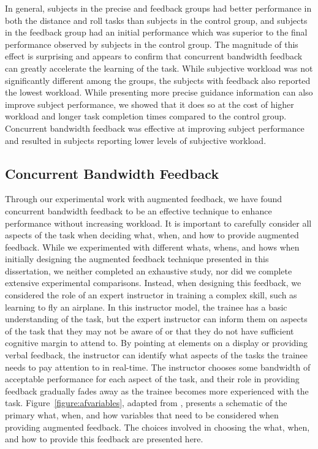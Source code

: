 In general, subjects in the precise and feedback groups had better performance in both the distance and roll tasks than subjects in the control group, and subjects in the feedback group had an initial performance which was superior to the final performance observed by subjects in the control group.
The magnitude of this effect is surprising and appears to confirm that concurrent bandwidth feedback can greatly accelerate the learning of the task.
While subjective workload was not significantly different among the groups, the subjects with feedback also reported the lowest workload.
While presenting more precise guidance information can also improve subject performance, we showed that it does so at the cost of higher workload and longer task completion times compared to the control group.
Concurrent bandwidth feedback was effective at improving subject performance and resulted in subjects reporting lower levels of subjective workload.

\subsection{Concurrent Bandwidth Feedback} \label{section:cbf}

Through our experimental work with augmented feedback, we have found concurrent bandwidth feedback to be an effective technique to enhance performance without increasing workload.
It is important to carefully consider all aspects of the task when deciding what, when, and how to provide augmented feedback.
While we experimented with different whats, whens, and hows when initially designing the augmented feedback technique presented in this dissertation, we neither completed an exhaustive study, nor did we complete extensive experimental comparisons.
Instead, when designing this feedback, we considered the role of an expert instructor in training a complex skill, such as learning to fly an airplane.
In this instructor model, the trainee has a basic understanding of the task, but the expert instructor can inform them on aspects of the task that they may not be aware of or that they do not have sufficient cognitive margin to attend to.
By pointing at elements on a display or providing verbal feedback, the instructor can identify what aspects of the tasks the trainee needs to pay attention to in real-time.
The instructor chooses some bandwidth of acceptable performance for each aspect of the task, and their role in providing feedback gradually fades away as the trainee becomes more experienced with the task.
Figure~\ref{figure:afvariables}, adapted from \citeauthor{hodges2020skill}, presents a schematic of the primary what, when, and how variables that need to be considered when providing augmented feedback.
The choices involved in choosing the what, when, and how to provide this feedback are presented here.

